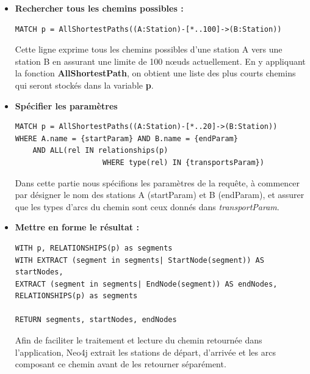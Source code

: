 \begin{itemize}

\item \textbf{Rechercher tous les chemins possibles :}
 \begin{lstlisting}[style=cypher]
MATCH p = AllShortestPaths((A:Station)-[*..100]->(B:Station))
\end{lstlisting}
Cette ligne exprime tous les chemins possibles d'une station A vers une station B en assurant une limite de 100 nœuds actuellement. En y appliquant la fonction \textbf{AllShortestPath}, on obtient une liste des plus courts chemins qui seront stockés dans la variable \textbf{p}.

\item \textbf{Spécifier les paramètres}
 \begin{lstlisting}[style=cypher]
MATCH p = AllShortestPaths((A:Station)-[*..20]->(B:Station))
WHERE A.name = {startParam} AND B.name = {endParam}
	AND ALL(rel IN relationships(p) 
					WHERE type(rel) IN {transportsParam})
\end{lstlisting}
Dans cette partie nous spécifions les paramètres de la requête, à commencer par désigner le nom des stations A (startParam) et B (endParam), et assurer que les types d'arcs du chemin sont ceux donnés dans \emph{transportParam}.

\item \textbf{Mettre en forme le résultat :}
 \begin{lstlisting}[style=cypher]
WITH p, RELATIONSHIPS(p) as segments
WITH EXTRACT (segment in segments| StartNode(segment)) AS startNodes,
EXTRACT (segment in segments| EndNode(segment)) AS endNodes,
RELATIONSHIPS(p) as segments

RETURN segments, startNodes, endNodes

\end{lstlisting}

Afin de faciliter le traitement et lecture du chemin retournée dans l'application, Neo4j extrait les stations de départ, d'arrivée et les arcs composant ce chemin  avant de les retourner séparément.
\end{itemize}

%
%
%            

